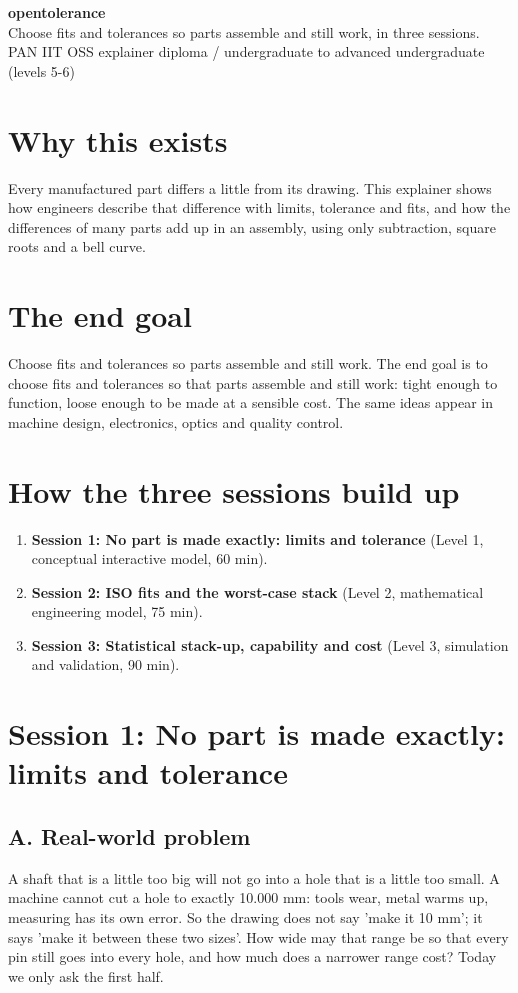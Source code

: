 \documentclass[11pt,a4paper]{article}
\begin{document}
\begin{center}{\LARGE\bfseries opentolerance}\\[0.4em]{\large Choose fits and tolerances so parts assemble and still work, in three sessions.}\\[0.2em]\small PAN IIT OSS explainer \textbullet{} diploma / undergraduate to advanced undergraduate (levels 5-6)\end{center}

\section*{Why this exists}
Every manufactured part differs a little from its drawing. This explainer shows how engineers describe that difference with limits, tolerance and fits, and how the differences of many parts add up in an assembly, using only subtraction, square roots and a bell curve.

\section*{The end goal}
Choose fits and tolerances so parts assemble and still work. The end goal is to choose fits and tolerances so that parts assemble and still work: tight enough to function, loose enough to be made at a sensible cost. The same ideas appear in machine design, electronics, optics and quality control.

\section*{How the three sessions build up}
\begin{enumerate}[nosep]
\item \textbf{Session 1: No part is made exactly: limits and tolerance} (Level 1, conceptual interactive model, 60 min).
\item \textbf{Session 2: ISO fits and the worst-case stack} (Level 2, mathematical engineering model, 75 min).
\item \textbf{Session 3: Statistical stack-up, capability and cost} (Level 3, simulation and validation, 90 min).
\end{enumerate}

\section{Session 1: No part is made exactly: limits and tolerance}

\subsection*{A. Real-world problem}
A shaft that is a little too big will not go into a hole that is a little too small. A machine cannot cut a hole to exactly 10.000 mm: tools wear, metal warms up, measuring has its own error. So the drawing does not say 'make it 10 mm'; it says 'make it between these two sizes'. How wide may that range be so that every pin still goes into every hole, and how much does a narrower range cost? Today we only ask the first half.
\end{document}

